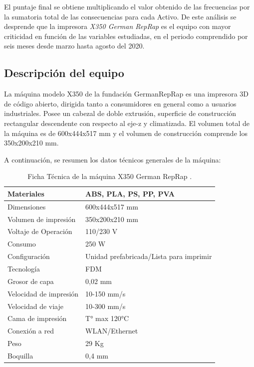 El puntaje final se obtiene multiplicando el valor obtenido de las frecuencias por la sumatoria total de las consecuencias para cada Activo. De este análisis se desprende que la impresora \textit{X350 German RepRap} es el equipo con mayor criticidad en función de las variables estudiadas, en el periodo comprendido por seis meses desde marzo hasta agosto del 2020.

\subsection{Descripción del equipo}

La máquina modelo X350 de la fundación GermanRepRap es una impresora 3D de código abierto, dirigida tanto a consumidores en general como a usuarios industriales. Posee un cabezal de doble extrusión, superficie de construcción rectangular descendente con respecto al eje-z y  climatizada. El volumen total de la máquina es de 600x444x517 mm y el volumen de construcción comprende los 350x200x210 mm.

A continuación, se resumen los datos técnicos generales de la máquina: 

\begin{table}[H]
  \centering
  
    \begin{tabular}{|l|l|}
    \hline
    Materiales & ABS, PLA, PS, PP, PVA \\
    \hline
    Dimensiones & 600x444x517 mm \\
    \hline
    Volumen de impresión & 350x200x210 mm \\
    \hline
    Voltaje de Operación & 110/230 V \\
    \hline
    Consumo & 250 W \\
    \hline
    Configuración  & Unidad prefabricada/Lista para imprimir \\
    \hline
    Tecnología & FDM \\
    \hline
    Grosor de capa & 0,02 mm \\
    \hline
    Velocidad de impresión  & 10-150 mm/s \\
    \hline
    Velocidad de viaje & 10-300 mm/s \\
    \hline
    Cama de impresión & T° max 120°C \\
    \hline
    Conexión a red & WLAN/Ethernet \\
    \hline
    Peso  & 29 Kg \\
    \hline
    Boquilla & 0,4 mm \\
    \hline
    \end{tabular}%
    \caption{Ficha Técnica de la máquina X350 German RepRap \citep{germanreprap2019}.}
  \label{tab:addlabel}%
\end{table}%

